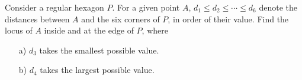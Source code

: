 Consider a regular hexagon $P$. For a given point $A$, $d_1 \leq d_2 \leq \cdots \leq d_6$ denote the
distances between $A$ and the six corners of $P$, in order of their value.
Find the locus of $A$ inside and at the edge of $P$, where
\begin{enumerate}
    \item[a)] $d_3$ takes the smallest possible value.
    \item[b)] $d_4$ takes the largest possible value.
\end{enumerate}
